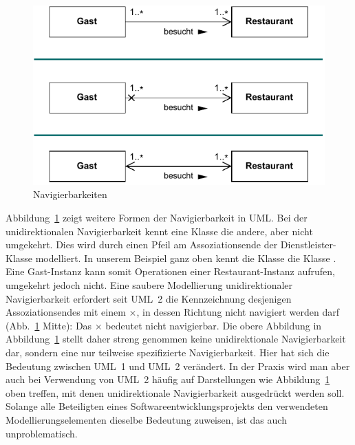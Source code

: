 \vspace{\baselineskip} %

\begin{figure}[h!]
	\centering
	\includegraphics[scale=1.0]{Bilder/Kapitel-8/navigierbarkeiten_gast_restaurant.pdf}
	\caption{Navigierbarkeiten}
	\label{fig:navigierbarkeiten_gast_restaurant}
\end{figure}

\pagebreak %

Abbildung~\ref{fig:navigierbarkeiten_gast_restaurant} zeigt weitere Formen der Navigierbarkeit in UML. Bei der unidirektionalen Navigierbarkeit kennt eine Klasse die andere, aber nicht umgekehrt. Dies wird durch einen Pfeil am Assoziationsende der Dienstleister-Klasse modelliert. In unserem Beispiel ganz oben kennt die Klasse  die Klasse . Eine Gast-Instanz kann somit Operationen einer Restaurant-Instanz aufrufen, umgekehrt jedoch nicht. Eine saubere Modellierung unidirektionaler Navigierbarkeit erfordert seit UML~2 die Kennzeichnung desjenigen Assoziationsendes mit einem {\Large$\times$}, in dessen Richtung nicht navigiert werden darf (Abb.~\ref{fig:navigierbarkeiten_gast_restaurant} Mitte): Das {\Large$\times$} bedeutet nicht navigierbar. Die obere Abbildung in Abbildung~\ref{fig:navigierbarkeiten_gast_restaurant} stellt daher streng genommen keine unidirektionale Navigierbarkeit dar, sondern eine nur teilweise spezifizierte Navigierbar\-keit. Hier hat sich die Bedeutung zwischen UML~1 und UML~2 verändert. In der Praxis wird man aber auch bei Verwendung von UML~2 häufig auf Darstellungen wie Abbildung~\ref{fig:navigierbarkeiten_gast_restaurant} oben treffen, mit denen unidirektionale Navigierbarkeit ausgedrückt werden soll. Solange alle Beteiligten eines Softwareentwicklungsprojekts den verwendeten Modellierungselementen dieselbe Bedeutung zuweisen, ist das auch unproblematisch.

